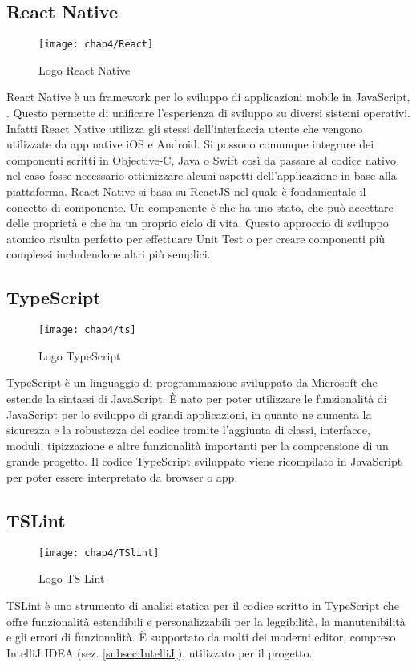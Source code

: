 \subsection{React Native}
\begin{figure}[H] 
	\centering
	\texttt{[image: chap4/React]}
	\caption{Logo React Native}
\end{figure}
React Native è un framework per lo sviluppo di applicazioni mobile in
JavaScript, . Questo permette di 
unificare l'esperienza di sviluppo su diversi sistemi operativi. Infatti React 
Native utilizza gli stessi  dell'interfaccia utente che 
vengono utilizzate da app native iOS e Android. 
Si possono comunque integrare dei componenti scritti in Objective-C,
Java o Swift così da passare al codice nativo nel caso fosse necessario
ottimizzare alcuni aspetti dell'applicazione in base alla piattaforma.
React Native si basa su ReactJS nel quale è fondamentale il concetto di
componente. Un componente è  che ha uno stato, che può accettare
delle proprietà e che ha un proprio ciclo di vita. Questo approccio di
sviluppo atomico risulta perfetto per effettuare Unit Test o per creare
componenti più complessi includendone altri più semplici.

\subsection{TypeScript}
\begin{figure}[H] 
	\centering
	\texttt{[image: chap4/ts]}
	\caption{Logo TypeScript}
\end{figure}
TypeScript è un linguaggio di programmazione sviluppato da Microsoft che
estende la sintassi di JavaScript. È nato per poter utilizzare le funzionalità
di JavaScript per lo sviluppo di grandi applicazioni, in quanto ne aumenta la
sicurezza e la robustezza del codice tramite l'aggiunta di classi,
interfacce, moduli, tipizzazione e altre funzionalità importanti per la 
comprensione di un grande progetto.
Il codice TypeScript sviluppato viene ricompilato in JavaScript per poter
essere interpretato da browser o app.

\subsection{TSLint}
\begin{figure}[H] 
	\centering
	\texttt{[image: chap4/TSlint]}
	\caption{Logo TS Lint}
\end{figure}
TSLint è uno strumento di analisi statica per il codice scritto in TypeScript che offre funzionalità estendibili e personalizzabili per la leggibilità, la manutenibilità e gli errori di funzionalità. È supportato da molti dei moderni editor, compreso IntelliJ IDEA (sez. \ref{subsec:IntelliJ}), utilizzato per il progetto.

